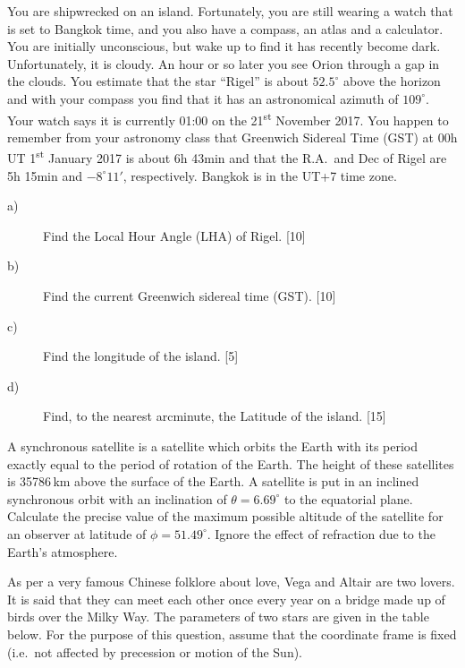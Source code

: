 You are shipwrecked on an island. Fortunately, you are still wearing a watch
that is set to Bangkok time, and you also have a compass, an atlas and a
calculator. You are initially unconscious, but wake up to find it has recently
become dark. Unfortunately, it is cloudy. An hour or so later you see Orion
through a gap in the clouds. You estimate that the star ``Rigel'' is about
$52.5^\circ$ above the horizon and with your compass you find that it has an
astronomical azimuth of $109^\circ$. Your watch says it is currently 01:00 on
the 21\textsuperscript{st} November 2017. You happen to remember from your
astronomy class that Greenwich Sidereal Time (GST) at 00h UT
1\textsuperscript{st} January 2017 is about 6h 43min and that the R.A.\ and Dec
of Rigel are 5h 15min and $-8^\circ 11'$, respectively. Bangkok is in the UT+7
time zone.

\begin{description}
\item[a)] Find the Local Hour Angle (LHA) of Rigel. \hfill[10]
\item[b)] Find the current Greenwich sidereal time (GST). \hfill[10]
\item[c)] Find the longitude of the island. \hfill[5]
\item[d)] Find, to the nearest arcminute, the Latitude of the island.
  \hfill[15]
\end{description}

A synchronous satellite is a satellite which orbits the Earth with its period
exactly equal to the period of rotation of the Earth. The height of these
satellites is 35786\,km above the surface of the Earth. A satellite is put in
an inclined synchronous orbit with an inclination of $\theta = 6.69^\circ$ to
the equatorial plane. Calculate the precise value of the maximum possible
altitude of the satellite for an observer at latitude of $\phi = 51.49^\circ$.
Ignore the effect of refraction due to the Earth's atmosphere.

As per a very famous Chinese folklore about love, Vega and Altair are two
lovers. It is said that they can meet each other once every year on a bridge
made up of birds over the Milky Way. The parameters of two stars are given in
the table below. For the purpose of this question, assume that the coordinate
frame is fixed (i.e.\ not affected by precession or motion of the Sun).

